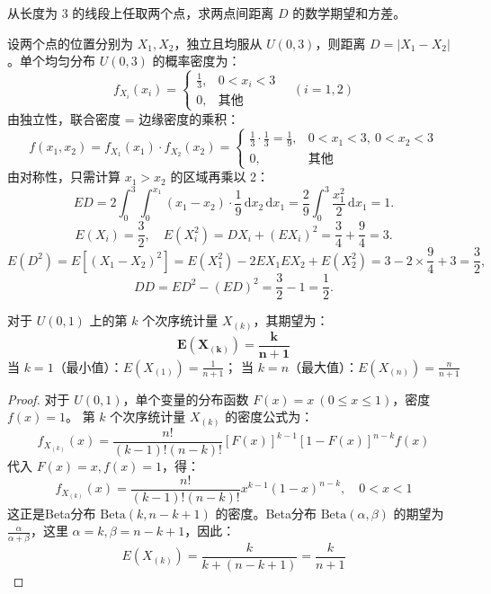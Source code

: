 \documentclass[lang=cn,11pt]{elegantbook}
\begin{document}
\begin{exercise}\label{exer:4-two-points}
从长度为 3 的线段上任取两个点，求两点间距离 \(D\) 的数学期望和方差。
\end{exercise}
\begin{solution}
设两个点的位置分别为 \(X_1, X_2\)，独立且均服从 \(U(0,3)\)，则距离 \(D = |X_1 - X_2|\)。单个均匀分布 \( U(0,3) \) 的概率密度为：
\[f_{X_i}(x_i) =\begin{cases}\displaystyle \frac{1}{3}, & 0 < x_i < 3 \\0, & \text{其他}\end{cases}\quad (i=1,2)\]
由独立性，联合密度 = 边缘密度的乘积：
  \[
  f(x_1,x_2) = f_{X_1}(x_1) \cdot f_{X_2}(x_2) =
  \begin{cases}
  \displaystyle \frac{1}{3} \cdot \frac{1}{3} = \frac{1}{9}, & 0 < x_1 < 3,\ 0 < x_2 < 3 \\
  0, & \text{其他}
  \end{cases}
  \]
由对称性，只需计算 \(x_1 > x_2\) 的区域再乘以 2：
\[
ED = 2\int_0^3 \int_0^{x_1} (x_1 - x_2) \cdot \frac{1}{9}\,\mathrm{d}x_2\,\mathrm{d}x_1
= \frac{2}{9}\int_0^3 \frac{x_1^2}{2}\,\mathrm{d}x_1 = 1.
\]
\[
E(X_i) = \frac{3}{2},\quad E(X_i^2) = DX_i + (EX_i)^2 = \frac{3}{4} + \frac{9}{4} = 3.
\]
\[
E(D^2) = E[(X_1 - X_2)^2] = E(X_1^2) - 2EX_1 EX_2 + E(X_2^2) = 3 - 2 \times \frac{9}{4} + 3 = \frac{3}{2},
\]
\[
DD = ED^2 - (ED)^2 = \frac{3}{2} - 1 = \frac{1}{2}.
\]
\end{solution}

\begin{proposition}[均匀分布次序统计量的通用结论]\label{prop:order-stat-uniform}
对于 \( U(0,1) \) 上的第 \( k \) 个次序统计量 \( X_{(k)} \)，其期望为：
\[
\boldsymbol{E(X_{(k)}) = \frac{k}{n+1}}
\]
当 \( k=1 \)（最小值）：\( E(X_{(1)}) = \frac{1}{n+1} \)； 当 \( k=n \)（最大值）：\( E(X_{(n)}) = \frac{n}{n+1} \)
\end{proposition}
\begin{proof}
对于 \( U(0,1) \)，单个变量的分布函数 \( F(x)=x \ (0\leq x\leq1) \)，密度 \( f(x)=1 \)。
第 \( k \) 个次序统计量 \( X_{(k)} \) 的密度公式为：
\[
f_{X_{(k)}}(x) = \frac{n!}{(k-1)!(n-k)!} [F(x)]^{k-1} [1-F(x)]^{n-k} f(x)
\]
代入 \( F(x)=x, f(x)=1 \)，得：
\[
f_{X_{(k)}}(x) = \frac{n!}{(k-1)!(n-k)!} x^{k-1} (1-x)^{n-k}, \quad 0<x<1
\]
这正是Beta分布 \( \text{Beta}(k, n-k+1) \) 的密度。Beta分布 \( \text{Beta}(\alpha,\beta) \) 的期望为 \( \frac{\alpha}{\alpha+\beta} \)，这里 \( \alpha=k, \beta=n-k+1 \)，因此：
\[
E(X_{(k)}) = \frac{k}{k + (n-k+1)} = \frac{k}{n+1}
\]
\end{proof}
\end{document}
